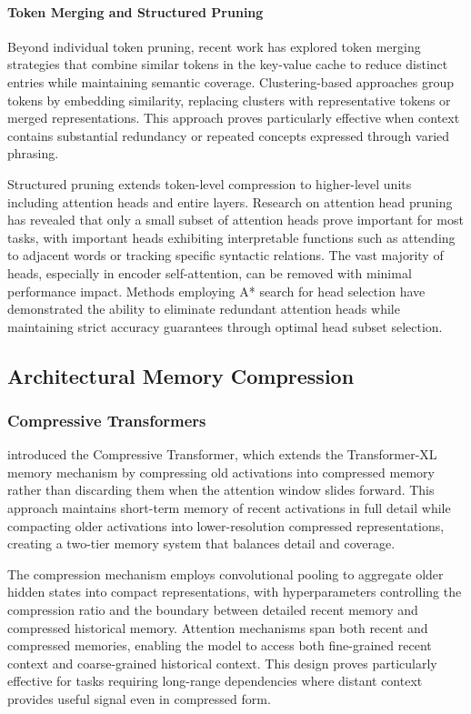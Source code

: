 \documentclass[11pt,letterpaper]{article}
\begin{document}
\paragraph{Token Merging and Structured Pruning}

Beyond individual token pruning, recent work has explored token merging strategies that combine similar tokens in the key-value cache to reduce distinct entries while maintaining semantic coverage. Clustering-based approaches group tokens by embedding similarity, replacing clusters with representative tokens or merged representations. This approach proves particularly effective when context contains substantial redundancy or repeated concepts expressed through varied phrasing.

Structured pruning extends token-level compression to higher-level units including attention heads and entire layers. Research on attention head pruning has revealed that only a small subset of attention heads prove important for most tasks, with important heads exhibiting interpretable functions such as attending to adjacent words or tracking specific syntactic relations. The vast majority of heads, especially in encoder self-attention, can be removed with minimal performance impact. Methods employing A* search for head selection have demonstrated the ability to eliminate redundant attention heads while maintaining strict accuracy guarantees through optimal head subset selection.

\subsection{Architectural Memory Compression}

\subsubsection{Compressive Transformers}

\cite{rae2020compressive} introduced the Compressive Transformer, which extends the Transformer-XL memory mechanism by compressing old activations into compressed memory rather than discarding them when the attention window slides forward. This approach maintains short-term memory of recent activations in full detail while compacting older activations into lower-resolution compressed representations, creating a two-tier memory system that balances detail and coverage.

The compression mechanism employs convolutional pooling to aggregate older hidden states into compact representations, with hyperparameters controlling the compression ratio and the boundary between detailed recent memory and compressed historical memory. Attention mechanisms span both recent and compressed memories, enabling the model to access both fine-grained recent context and coarse-grained historical context. This design proves particularly effective for tasks requiring long-range dependencies where distant context provides useful signal even in compressed form.
\end{document}
